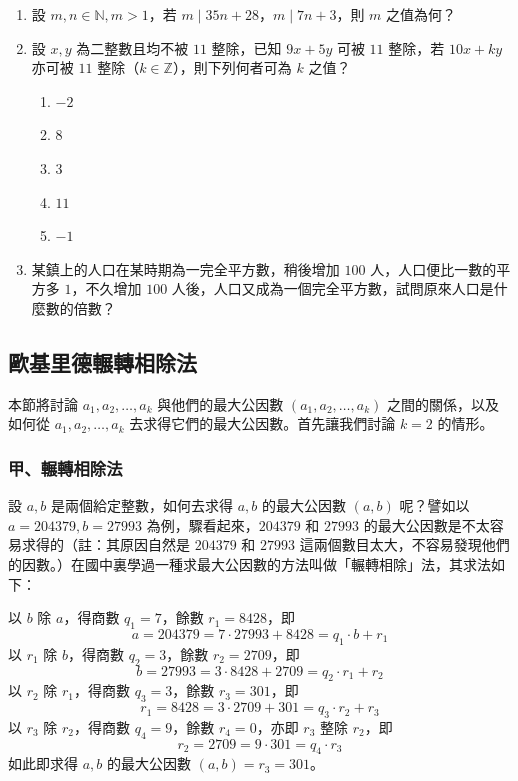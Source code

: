 \begin{enumerate}[1.]
  \item 設 $m, n \in \mathbb{N}, m > 1$，若 $m \mid 35n+28$，$m \mid 7n+3$，則 $m$ 之值為何？

  \item 設 $x, y$ 為二整數且均不被 $11$ 整除，已知 $9x+5y$ 可被 $11$ 整除，若 $10x+ky$ 亦可被 $11$ 整除（$k \in \mathbb{Z}$），則下列何者可為 $k$ 之值？
  \begin{enumerate}[(1)]
    \item $-2$
    \item $8$
    \item $3$
    \item $11$
    \item $-1$
  \end{enumerate}

  \item 某鎮上的人口在某時期為一完全平方數，稍後增加 $100$ 人，人口便比一數的平方多 $1$，不久增加 $100$ 人後，人口又成為一個完全平方數，試問原來人口是什麼數的倍數？
\end{enumerate}

\subsection{歐基里德輾轉相除法}\label{sec:6-2}

本節將討論 $a_1, a_2, \dots, a_k$ 與他們的最大公因數 $(a_1, a_2, \dots, a_k)$ 之間的關係，以及如何從 $a_1, a_2, \dots, a_k$ 去求得它們的最大公因數。首先讓我們討論 $k=2$ 的情形。

\subsubsection*{甲、輾轉相除法}\label{subsec:6-2-a}

設 $a, b$ 是兩個給定整數，如何去求得 $a, b$ 的最大公因數 $(a, b)$ 呢？譬如以 $a=204379, b=27993$ 為例，驟看起來，$204379$ 和 $27993$ 的最大公因數是不太容易求得的（註：其原因自然是 $204379$ 和 $27993$ 這兩個數目太大，不容易發現他們的因數。）在國中裏學過一種求最大公因數的方法叫做「輾轉相除」法，其求法如下：

以 $b$ 除 $a$，得商數 $q_1=7$，餘數 $r_1=8428$，即
\begin{equation}
  a = 204379 = 7 \cdot 27993 + 8428 = q_1 \cdot b + r_1 \label{eq:euclid_step1}
\end{equation}
以 $r_1$ 除 $b$，得商數 $q_2=3$，餘數 $r_2=2709$，即
\begin{equation}
  b = 27993 = 3 \cdot 8428 + 2709 = q_2 \cdot r_1 + r_2 \label{eq:euclid_step2}
\end{equation}
以 $r_2$ 除 $r_1$，得商數 $q_3=3$，餘數 $r_3=301$，即
\begin{equation}
  r_1 = 8428 = 3 \cdot 2709 + 301 = q_3 \cdot r_2 + r_3 \label{eq:euclid_step3}
\end{equation}
以 $r_3$ 除 $r_2$，得商數 $q_4=9$，餘數 $r_4=0$，亦即 $r_3$ 整除 $r_2$，即
\begin{equation}
  r_2 = 2709 = 9 \cdot 301 = q_4 \cdot r_3 \label{eq:euclid_step4}
\end{equation}
如此即求得 $a, b$ 的最大公因數 $(a, b) = r_3 = 301$。

